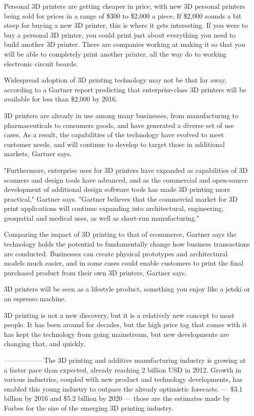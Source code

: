 \documentclass[11pt,a4paper,titlepage]{article}
\begin{document}
Personal 3D printers are getting cheaper in price, with new 3D personal printers being sold for prices in a range of \$300 to \$2,000 a piece. If \$2,000 sounds a bit steep for buying a new 3D printer, this is where it gets interesting. If you were to buy a personal 3D printer, you could print just about everything you need to build another 3D printer. There are companies working at making it so that you will be able to completely print another printer, all the way do to working electronic circuit boards.

 Widespread adoption of 3D printing technology may not be that far away, according to a Gartner report predicting that enterprise-class 3D printers will be available for less than \$2,000 by 2016.

3D printers are already in use among many businesses, from manufacturing to pharmaceuticals to consumers goods, and have generated a diverse set of use cases. As a result, the capabilities of the technology have evolved to meet customer needs, and will continue to develop to target those in additional markets, Gartner says.

"Furthermore, enterprise uses for 3D printers have expanded as capabilities of 3D scanners and design tools have advanced, and as the commercial and open-source development of additional design software tools has made 3D printing more practical," Gartner says. "Gartner believes that the commercial market for 3D print applications will continue expanding into architectural, engineering, geospatial and medical uses, as well as short-run manufacturing."

Comparing the impact of 3D printing to that of ecommerce, Gartner says the technology holds the potential to fundamentally change how business transactions are conducted. Businesses can create physical prototypes and architectural models much easier, and in some cases could enable customers to print the final purchased product from their own 3D printers, Gartner says.

3D printers will be seen as a lifestyle product, something you enjoy like a jetski or an espresso machine.

3D printing is not a new discovery, but it is a relatively new concept to most people. It has been around for decades, but the high price tag that comes with it has kept the technology from going mainstream, but new developments are changing that, and quickly.

-----------------
The 3D printing and additive manufacturing industry is growing at a faster pace than expected, already reaching 2 billion USD in 2012.  Growth in various industries, coupled with new product and technology developments, has enabled this young industry to outpace the already optimistic forecasts.
---
\$3.1 billion by 2016 and \$5.2 billion by 2020 — those are the estimates made by Forbes for the size of the emerging 3D printing industry.
\end{document}
